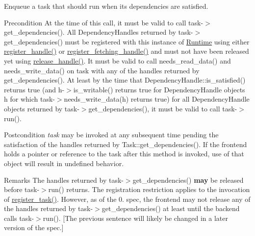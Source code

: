 Enqueue a task that should run when its dependencies are satisfied. 

\begin{DoxyPrecond}{Precondition}
At the time of this call, it must be valid to call task-\/$>$get\+\_\+dependencies(). All Dependency\+Handles returned by task-\/$>$get\+\_\+dependencies() must be registered with this instance of \hyperlink{classdarma__runtime_1_1abstract_1_1backend_1_1_runtime}{Runtime} using either \hyperlink{classdarma__runtime_1_1abstract_1_1backend_1_1_runtime_a8c70dc2b90fedd7ae6f090a19b3f694f}{register\+\_\+handle()} or \hyperlink{classdarma__runtime_1_1abstract_1_1backend_1_1_runtime_acdb81206fe8a663754cf68f44731b35e}{register\+\_\+fetching\+\_\+handle()} and must not have been released yet using \hyperlink{classdarma__runtime_1_1abstract_1_1backend_1_1_runtime_a54ba21615ed22638ea23a2a1f03fea02}{release\+\_\+handle()}. It must be valid to call needs\+\_\+read\+\_\+data() and needs\+\_\+write\+\_\+data() on {\ttfamily task} with any of the handles returned by get\+\_\+dependencies(). At least by the time that Dependency\+Handle\+::is\+\_\+satisfied() returns true (and h-\/$>$is\+\_\+writable() returns true for Dependency\+Handle objects h for which task-\/$>$needs\+\_\+write\+\_\+data(h) returns true) for all Dependency\+Handle objects returned by task-\/$>$get\+\_\+dependencies(), it must be valid to call task-\/$>$run().
\end{DoxyPrecond}
\begin{DoxyPostcond}{Postcondition}
{\itshape task} may be invoked at any subsequent time pending the satisfaction of the handles returned by Task\+::get\+\_\+dependencies(). If the frontend holds a pointer or reference to the task after this method is invoked, use of that object will result in undefined behavior.
\end{DoxyPostcond}
\begin{DoxyRemark}{Remarks}
The handles returned by task-\/$>$get\+\_\+dependencies() {\bfseries may} be released before task-\/$>$run() returns. The registration restriction applies to the invocation of \hyperlink{classdarma__runtime_1_1abstract_1_1backend_1_1_runtime_aec2382c6822c63ed76f69af1e1f8470b}{register\+\_\+task()}. However, as of the 0. spec, the frontend may not release any of the handles returned by task-\/$>$get\+\_\+dependencies() at least until the backend calls task-\/$>$run(). \mbox{[}The previous sentence will likely be changed in a later version of the spec.\mbox{]}
\end{DoxyRemark}

